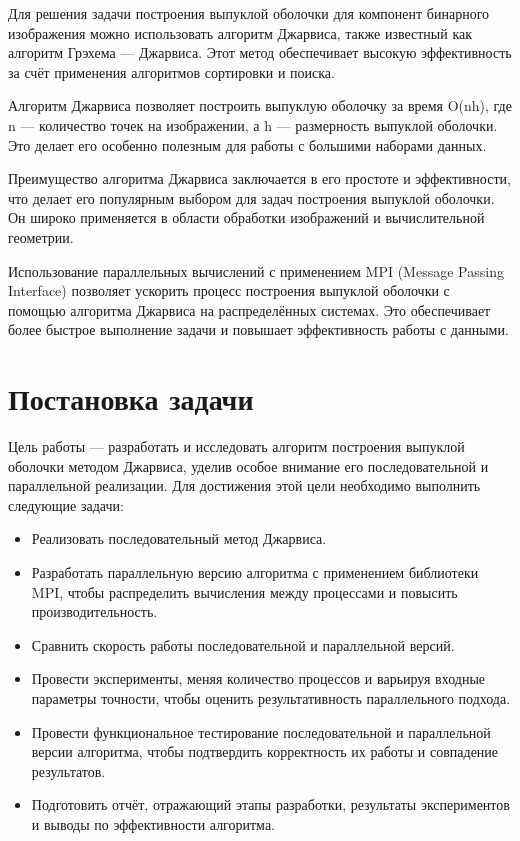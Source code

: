 \documentclass[12pt]{article}
\begin{document}
Для решения задачи построения выпуклой оболочки для компонент бинарного изображения можно использовать алгоритм Джарвиса, также известный как алгоритм Грэхема — Джарвиса. Этот метод обеспечивает высокую эффективность за счёт применения алгоритмов сортировки и поиска.

Алгоритм Джарвиса позволяет построить выпуклую оболочку за время O(nh), где n — количество точек на изображении, а h — размерность выпуклой оболочки. Это делает его особенно полезным для работы с большими наборами данных.

Преимущество алгоритма Джарвиса заключается в его простоте и эффективности, что делает его популярным выбором для задач построения выпуклой оболочки. Он широко применяется в области обработки изображений и вычислительной геометрии.

Использование параллельных вычислений с применением MPI (Message Passing Interface) позволяет ускорить процесс построения выпуклой оболочки с помощью алгоритма Джарвиса на распределённых системах. Это обеспечивает более быстрое выполнение задачи и повышает эффективность работы с данными.

\section*{Постановка задачи}
Цель работы — разработать и исследовать алгоритм построения выпуклой оболочки методом Джарвиса, уделив особое внимание его последовательной и параллельной реализации.
Для достижения этой цели необходимо выполнить следующие задачи:
\begin{itemize}
    \item Реализовать последовательный метод Джарвиса.
    \item Разработать параллельную версию алгоритма с применением библиотеки MPI, чтобы распределить вычисления между процессами и повысить производительность.
    \item Сравнить скорость работы последовательной и параллельной версий.
    \item Провести эксперименты, меняя количество процессов и варьируя входные параметры точности, чтобы оценить результативность параллельного подхода.
    \item Провести функциональное тестирование последовательной и параллельной версии алгоритма, чтобы подтвердить корректность их работы и совпадение результатов.
    \item Подготовить отчёт, отражающий этапы разработки, результаты экспериментов и выводы по эффективности алгоритма.
\end{itemize}
\end{document}
